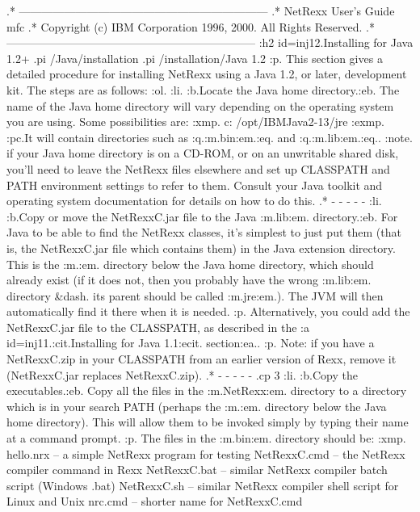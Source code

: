.* ------------------------------------------------------------------
.* NetRexx User's Guide                                              mfc
.* Copyright (c) IBM Corporation 1996, 2000.  All Rights Reserved.
.* ------------------------------------------------------------------
:h2 id=inj12.Installing for Java 1.2+
.pi /Java/installation
.pi /installation/Java 1.2
:p.
This section gives a detailed procedure for installing NetRexx using a
Java 1.2, or later, development kit.  The steps are as follows:
:ol.
:li.
:b.Locate the Java home directory.:eb.
The name of the Java home directory will vary depending on the operating
system you are using.  Some possibilities are:
:xmp.
\jre
c:\jre
/opt/IBMJava2-13/jre
:exmp.
:pc.It will contain directories such as :q.:m.bin:em.:eq. and
:q.:m.lib:em.:eq..
:note. if your Java home directory is on a CD-ROM, or on an unwritable
shared disk, you'll need to leave the NetRexx files elsewhere and set up
CLASSPATH and PATH environment settings to refer to them.
Consult your Java toolkit and operating system documentation for details
on how to do this.
.* - - - - -
:li.
:b.Copy or move the NetRexxC.jar file to the Java :m.lib\ext:em.
directory.:eb.
For Java to be able to find the NetRexx classes, it's simplest to just
put them (that is, the NetRexxC.jar file which contains them) in the
Java extension directory.  This is the :m.\lib\ext:em. directory below
the Java home directory, which should already exist (if it does not,
then you probably have the wrong :m.lib:em. directory &dash. its parent
should be called :m.jre:em.).
The JVM will then automatically find it there when it is needed.
:p.
Alternatively, you could add the NetRexxC.jar file to the CLASSPATH, as
described in the :a id=inj11.:cit.Installing for Java 1.1:ecit. section:ea..
:p.
Note: if you have a NetRexxC.zip in your CLASSPATH from an earlier
version of Rexx, remove it (NetRexxC.jar replaces NetRexxC.zip).
.* - - - - -
.cp 3
:li.
:b.Copy the executables.:eb.
Copy all the files in the :m.NetRexx\bin:em. directory to a directory
which is in your search PATH (perhaps the :m.\bin:em. directory below
the Java home directory).  This will allow them to be invoked simply by
typing their name at a command prompt.
:p.
The files in the :m.bin:em. directory should be:
:xmp.
hello.nrx    -- a simple NetRexx program for testing
NetRexxC.cmd -- the NetRexx compiler command in Rexx
NetRexxC.bat -- similar NetRexx compiler batch script (Windows .bat)
NetRexxC.sh  -- similar NetRexx compiler shell script for Linux and Unix
nrc.cmd      -- shorter name for NetRexxC.cmd
